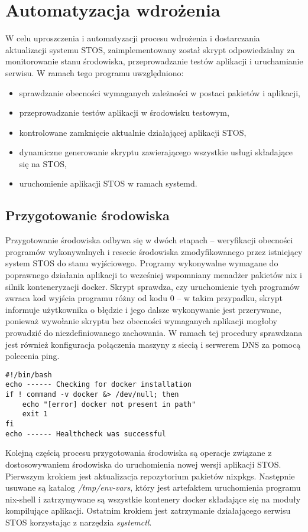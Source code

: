 
\section{Automatyzacja wdrożenia}
W celu uproszczenia i automatyzacji procesu wdrożenia i dostarczania aktualizacji systemu STOS, zaimplementowany został skrypt odpowiedzialny za monitorowanie stanu środowiska, przeprowadzanie testów aplikacji i uruchamianie serwisu. W ramach tego programu uwzględniono:
\begin{itemize}
	\item sprawdzanie obecności wymaganych zależności w postaci pakietów i aplikacji,
	\item przeprowadzanie testów aplikacji w środowisku testowym,
	\item kontrolowane zamknięcie aktualnie działającej aplikacji STOS,
	\item dynamiczne generowanie skryptu zawierającego wszystkie usługi składające się na STOS,
	\item uruchomienie aplikacji STOS w ramach systemd.
\end{itemize}
\subsection{Przygotowanie środowiska}
Przygotowanie środowiska odbywa się w dwóch etapach -- weryfikacji obecności programów wykonywalnych i resecie środowiska zmodyfikowanego przez istniejący system STOS do stanu wyjściowego. 
\newline \noindent Programy wykonywalne wymagane do poprawnego działania aplikacji to wcześniej wspomniany menadżer pakietów nix i silnik konteneryzacji docker. Skrypt sprawdza, czy uruchomienie tych programów zwraca kod wyjścia programu różny od kodu 0 -- w takim przypadku, skrypt informuje użytkownika o błędzie i jego dalsze wykonywanie jest przerywane, ponieważ wywołanie skryptu bez obecności wymaganych aplikacji mogłoby prowadzić do niezdefiniowanego zachowania. W ramach tej procedury sprawdzana jest również konfiguracja połączenia maszyny z siecią i serwerem DNS za pomocą polecenia ping.
\lstset{style=shell}
\begin{lstlisting}[caption = {Przykład weryfikacji obecności instalacji programu "docker" w systemie.}]
#!/bin/bash
echo ------ Checking for docker installation 
if ! command -v docker &> /dev/null; then
    echo "[error] docker not present in path"
    exit 1
fi
echo ------ Healthcheck was successful 
\end{lstlisting}
\noindent Kolejną częścią procesu przygotowania środowiska są operacje związane z dostosowywaniem środowiska do uruchomienia nowej wersji aplikacji STOS. Pierwszym krokiem jest aktualizacja repozytorium pakietów nixpkgs. Następnie usuwane są katalog \textit{/tmp/env-vars}, który jest artefaktem uruchomienia programu nix-shell i zatrzymywane są wszystkie kontenery docker składające się na moduły kompilujące aplikacji. Ostatnim krokiem jest zatrzymanie działającego serwisu STOS korzystając z narzędzia \textit{systemctl}.
